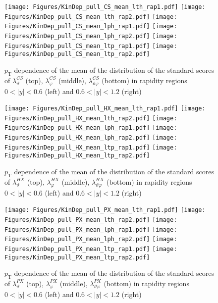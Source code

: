 \documentclass[12pt]{article}
\newcommand{\pT}{p_\mathrm{T}}
\newcommand{\absy}{\left |  y \right |}
\newcommand{\lamthCS}{\lambda^{\scriptscriptstyle CS}_\vartheta}
\newcommand{\lamphCS}{\lambda^{\scriptscriptstyle CS}_\varphi}
\newcommand{\lamthphCS}{\lambda^{\scriptscriptstyle CS}_{\vartheta \varphi}}
\newcommand{\lamthHX}{\lambda^{\scriptscriptstyle HX}_\vartheta}
\newcommand{\lamphHX}{\lambda^{\scriptscriptstyle HX}_\varphi}
\newcommand{\lamthphHX}{\lambda^{\scriptscriptstyle HX}_{\vartheta \varphi}}
\newcommand{\lamthPX}{\lambda^{\scriptscriptstyle PX}_\vartheta}
\newcommand{\lamphPX}{\lambda^{\scriptscriptstyle PX}_\varphi}
\newcommand{\lamthphPX}{\lambda^{\scriptscriptstyle PX}_{\vartheta \varphi}}
\begin{document}


\begin{figure}[htbp]
\centering
\texttt{[image: Figures/KinDep\_pull\_CS\_mean\_lth\_rap1.pdf]}
\texttt{[image: Figures/KinDep\_pull\_CS\_mean\_lth\_rap2.pdf]}
\texttt{[image: Figures/KinDep\_pull\_CS\_mean\_lph\_rap1.pdf]}
\texttt{[image: Figures/KinDep\_pull\_CS\_mean\_lph\_rap2.pdf]}
\texttt{[image: Figures/KinDep\_pull\_CS\_mean\_ltp\_rap1.pdf]}
\texttt{[image: Figures/KinDep\_pull\_CS\_mean\_ltp\_rap2.pdf]}
\caption{$\pT$ dependence of the mean of the distribution of the standard scores
of $\lamthCS$ (top), $\lamphCS$ (middle), $\lamthphCS$ (bottom) in rapidity
regions $0<\absy<0.6$ (left) and $0.6<\absy<1.2$ (right)}
\end{figure}
\clearpage

\begin{figure}[htbp]
\centering
\texttt{[image: Figures/KinDep\_pull\_HX\_mean\_lth\_rap1.pdf]}
\texttt{[image: Figures/KinDep\_pull\_HX\_mean\_lth\_rap2.pdf]}
\texttt{[image: Figures/KinDep\_pull\_HX\_mean\_lph\_rap1.pdf]}
\texttt{[image: Figures/KinDep\_pull\_HX\_mean\_lph\_rap2.pdf]}
\texttt{[image: Figures/KinDep\_pull\_HX\_mean\_ltp\_rap1.pdf]}
\texttt{[image: Figures/KinDep\_pull\_HX\_mean\_ltp\_rap2.pdf]}
\caption{$\pT$ dependence of the mean of the distribution of the standard scores
of $\lamthHX$ (top), $\lamphHX$ (middle), $\lamthphHX$ (bottom) in rapidity
regions $0<\absy<0.6$ (left) and $0.6<\absy<1.2$ (right)}
\end{figure}
\clearpage

\begin{figure}[htbp]
\centering
\texttt{[image: Figures/KinDep\_pull\_PX\_mean\_lth\_rap1.pdf]}
\texttt{[image: Figures/KinDep\_pull\_PX\_mean\_lth\_rap2.pdf]}
\texttt{[image: Figures/KinDep\_pull\_PX\_mean\_lph\_rap1.pdf]}
\texttt{[image: Figures/KinDep\_pull\_PX\_mean\_lph\_rap2.pdf]}
\texttt{[image: Figures/KinDep\_pull\_PX\_mean\_ltp\_rap1.pdf]}
\texttt{[image: Figures/KinDep\_pull\_PX\_mean\_ltp\_rap2.pdf]}
\caption{$\pT$ dependence of the mean of the distribution of the standard scores
of $\lamthPX$ (top), $\lamphPX$ (middle), $\lamthphPX$ (bottom) in rapidity
regions $0<\absy<0.6$ (left) and $0.6<\absy<1.2$ (right)}
\end{figure}
\clearpage
\end{document}
